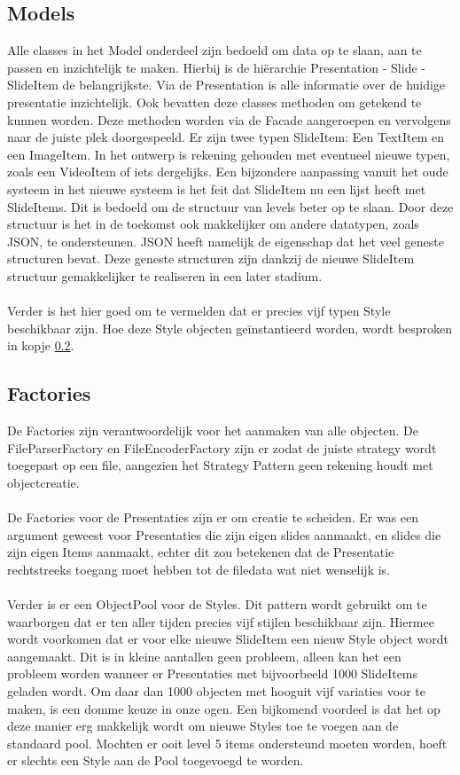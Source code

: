 \documentclass[a4paper]{article}
\newcommand{\1}[0]{\'{e}\'{e}n}
\begin{document}
\subsection{Models}
Alle classes in het Model onderdeel zijn bedoeld om data op te slaan, aan te passen en inzichtelijk te maken. Hierbij is de hi\"{e}rarchie Presentation - Slide - SlideItem de belangrijkste. Via de Presentation is alle informatie over de huidige presentatie inzichtelijk. Ook bevatten deze classes methoden om getekend te kunnen worden. Deze methoden worden via de Facade aangeroepen en vervolgens naar de juiste plek doorgespeeld. Er zijn twee typen SlideItem: Een TextItem en een ImageItem. In het ontwerp is rekening gehouden met eventueel nieuwe typen, zoals een VideoItem of iets dergelijks. Een bijzondere aanpassing vanuit het oude systeem in het nieuwe systeem is het feit dat SlideItem nu een lijst heeft met SlideItems. Dit is bedoeld om de structuur van levels beter op te slaan. Door deze structuur is het in de toekomst ook makkelijker om andere datatypen, zoals JSON, te ondersteunen. JSON heeft namelijk de eigenschap dat het veel geneste structuren bevat. Deze geneste structuren zijn dankzij de nieuwe SlideItem structuur gemakkelijker te realiseren in een later stadium.
\\\\
Verder is het hier goed om te vermelden dat er precies vijf typen Style beschikbaar zijn. Hoe deze Style objecten ge\"{i}nstantieerd worden, wordt besproken in kopje \ref{sub:factories}.

\subsection{Factories}
\label{sub:factories}
De Factories zijn verantwoordelijk voor het aanmaken van alle objecten. De
FileParserFactory en FileEncoderFactory zijn er zodat de juiste strategy wordt
toegepast op een file, aangezien het Strategy Pattern geen rekening houdt met
objectcreatie.
\\\\
De Factories voor de Presentaties zijn er om creatie te scheiden. Er was een
argument geweest voor Presentaties die zijn eigen slides aanmaakt, en slides
die zijn eigen Items aanmaakt, echter dit zou betekenen dat de Presentatie
rechtstreeks toegang moet hebben tot de filedata wat niet wenselijk is.
\\\\
Verder is er een ObjectPool voor de Styles. Dit pattern wordt gebruikt om te
waarborgen dat er ten aller tijden precies vijf stijlen beschikbaar zijn. Hiermee wordt voorkomen dat er voor elke nieuwe SlideItem een nieuw Style object wordt aangemaakt. Dit is in kleine aantallen geen probleem, alleen kan het een probleem worden wanneer er Presentaties met bijvoorbeeld 1000 SlideItems geladen wordt. Om daar dan 1000 objecten met hooguit vijf variaties voor te maken, is een domme keuze in onze ogen. Een bijkomend voordeel is dat het op deze manier erg makkelijk wordt om nieuwe Styles toe te voegen aan de standaard pool. Mochten er ooit level 5 items ondersteund moeten worden, hoeft er slechts een Style aan de Pool toegevoegd te worden.
\end{document}

